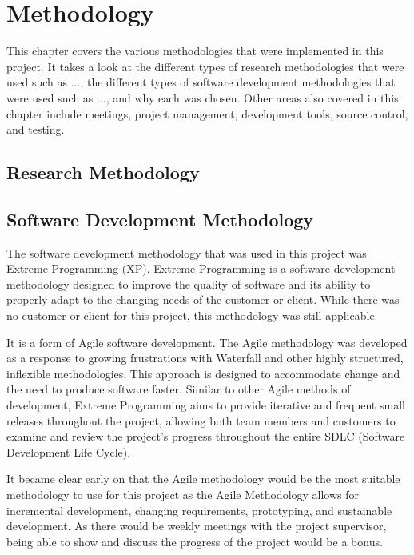 \chapter{Methodology}
This chapter covers the various methodologies that were implemented in this project. It takes a look at the different types of research methodologies that were used such as ..., the different types of software development methodologies that were used such as ..., and why each was chosen. Other areas also covered in this chapter include meetings, project management, development tools, source control, and testing.

\section{Research Methodology}

\section{Software Development Methodology}
The software development methodology that was used in this project was Extreme Programming (XP). Extreme Programming is a software development methodology designed to improve the quality of software and its ability to properly adapt to the changing needs of the customer or client. While there was no customer or client for this project, this methodology was still applicable. 
\par
\medskip
It is a form of Agile software development. The Agile methodology was developed as a response to growing frustrations with Waterfall and other highly structured, inflexible methodologies. This approach is designed to accommodate change and the need to produce software faster. Similar to other Agile methods of development, Extreme Programming aims to provide iterative and frequent small releases throughout the project, allowing both team members and customers to examine and review the project’s progress throughout the entire SDLC (Software Development Life Cycle). 
\par
\medskip
It became clear early on that the Agile methodology would be the most suitable methodology to use for this project as the Agile Methodology allows for incremental development, changing requirements, prototyping, and sustainable development. As there would be weekly meetings with the project supervisor, being able to show and discuss the progress of the project would be a bonus. 

